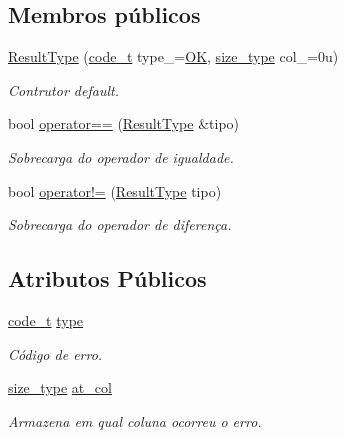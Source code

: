 \subsection*{Membros públicos}
\begin{DoxyCompactItemize}
\item 
\hyperlink{structParser_1_1ResultType_a7757f3a96430ce1ea8c8a15c8908cc50}{Result\+Type} (\hyperlink{structParser_1_1ResultType_ac63a3ce34d7a6a119b1902372116d457}{code\+\_\+t} type\+\_\+=\hyperlink{structParser_1_1ResultType_ac63a3ce34d7a6a119b1902372116d457a0125be86217a5d0cdad8f818c7e2fde0}{OK}, \hyperlink{structParser_1_1ResultType_a8f110ce090aad3f4016d241aaef768db}{size\+\_\+type} col\+\_\+=0u)
\begin{DoxyCompactList}\small\item\em Contrutor default. \end{DoxyCompactList}\item 
bool \hyperlink{structParser_1_1ResultType_a42567f764f3d1ffebdac55aad576f102}{operator==} (\hyperlink{structParser_1_1ResultType}{Result\+Type} \&tipo)
\begin{DoxyCompactList}\small\item\em Sobrecarga do operador de igualdade. \end{DoxyCompactList}\item 
bool \hyperlink{structParser_1_1ResultType_a1e2c9f1eaa6bce1b8be87572d21546ec}{operator!=} (\hyperlink{structParser_1_1ResultType}{Result\+Type} tipo)
\begin{DoxyCompactList}\small\item\em Sobrecarga do operador de diferença. \end{DoxyCompactList}\end{DoxyCompactItemize}
\subsection*{Atributos Públicos}
\begin{DoxyCompactItemize}
\item 
\hyperlink{structParser_1_1ResultType_ac63a3ce34d7a6a119b1902372116d457}{code\+\_\+t} \hyperlink{structParser_1_1ResultType_a62bbb21f81f4754df9e59312b6a0203b}{type}
\begin{DoxyCompactList}\small\item\em Código de erro. \end{DoxyCompactList}\item 
\hyperlink{structParser_1_1ResultType_a8f110ce090aad3f4016d241aaef768db}{size\+\_\+type} \hyperlink{structParser_1_1ResultType_acdb9aeac71c8dd81484e748414792a79}{at\+\_\+col}
\begin{DoxyCompactList}\small\item\em Armazena em qual coluna ocorreu o erro. \end{DoxyCompactList}\end{DoxyCompactItemize}


